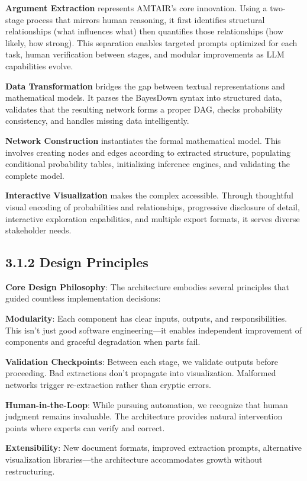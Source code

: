 \documentclass[
  11pt,
  letterpaper,
]{book}
\begin{document}
\textbf{Argument Extraction} represents AMTAIR's core innovation. Using
a two-stage process that mirrors human reasoning, it first identifies
structural relationships (what influences what) then quantifies those
relationships (how likely, how strong). This separation enables targeted
prompts optimized for each task, human verification between stages, and
modular improvements as LLM capabilities evolve.

\textbf{Data Transformation} bridges the gap between textual
representations and mathematical models. It parses the BayesDown syntax
into structured data, validates that the resulting network forms a
proper DAG, checks probability consistency, and handles missing data
intelligently.

\textbf{Network Construction} instantiates the formal mathematical
model. This involves creating nodes and edges according to extracted
structure, populating conditional probability tables, initializing
inference engines, and validating the complete model.

\textbf{Interactive Visualization} makes the complex accessible. Through
thoughtful visual encoding of probabilities and relationships,
progressive disclosure of detail, interactive exploration capabilities,
and multiple export formats, it serves diverse stakeholder needs.

\subsection{3.1.2 Design Principles}\label{sec-design-principles}

\textbf{Core Design Philosophy}: The architecture embodies several
principles that guided countless implementation decisions:

\textbf{Modularity}: Each component has clear inputs, outputs, and
responsibilities. This isn't just good software engineering---it enables
independent improvement of components and graceful degradation when
parts fail.

\textbf{Validation Checkpoints}: Between each stage, we validate outputs
before proceeding. Bad extractions don't propagate into visualization.
Malformed networks trigger re-extraction rather than cryptic errors.

\textbf{Human-in-the-Loop}: While pursuing automation, we recognize that
human judgment remains invaluable. The architecture provides natural
intervention points where experts can verify and correct.

\textbf{Extensibility}: New document formats, improved extraction
prompts, alternative visualization libraries---the architecture
accommodates growth without restructuring.
\end{document}
